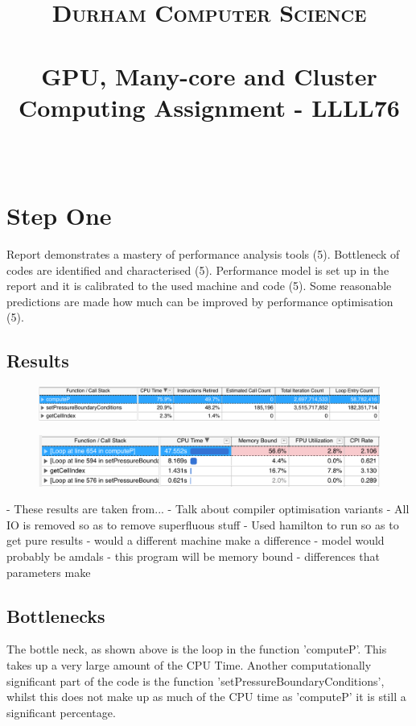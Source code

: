 \documentclass[paper=a4, fontsize=11pt]{scrartcl}
\date{}
\title{
		\vspace{-1in} 	
		\usefont{OT1}{bch}{b}{n}
		\normalfont \normalsize \textsc{Durham Computer Science} \\ [5pt]
		\horrule{0.5pt} \\[0.4cm]
		\huge  GPU, Many-core and Cluster Computing Assignment - LLLL76\\
		\horrule{2pt} \\[0.5cm]
		\vspace{-1in} 	
}
\numberwithin{equation}{section}		%
\numberwithin{figure}{section}			%
\numberwithin{table}{section}				%
\begin{document}
\maketitle
\section{Step One}
Report demonstrates a mastery of performance analysis tools (5). Bottleneck of codes are identified and characterised (5). Performance model is set up in the report and it is calibrated to the used machine and code (5). Some reasonable predictions are made how much can be improved by performance optimisation (5).
\subsection{Results}
\begin{figure}[h]
\caption{}
\includegraphics[width=\textwidth]{one.png}
\end{figure}
\begin{figure}[h]
\caption{}
\includegraphics[width=\textwidth]{two.png}
\end{figure}

- These results are taken from...
- Talk about compiler optimisation variants
- All IO is removed so as to remove superfluous stuff
- Used hamilton to run so as to get pure results
- would a different machine make a difference
- model would probably be amdals
- this program will be memory bound
- differences that parameters make

\subsection{Bottlenecks}

The bottle neck, as shown above is the loop in the function 'computeP'. This takes up a very large amount of the CPU Time. Another computationally significant part of the code is the function 'setPressureBoundaryConditions', whilst this does not make up as much of the CPU time as 'computeP' it is still a significant percentage.
\end{document}
